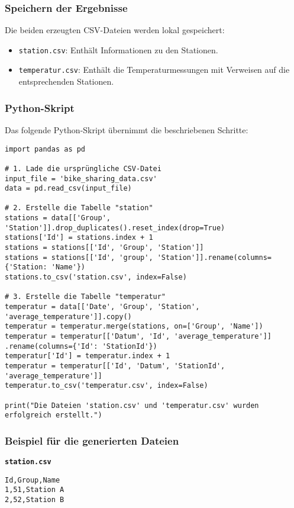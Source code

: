 \documentclass[a4paper,12pt]{article}
\begin{document}
\subsubsection{Speichern der Ergebnisse}
Die beiden erzeugten CSV-Dateien werden lokal gespeichert:
\begin{itemize}
    \item \texttt{station.csv}: Enthält Informationen zu den Stationen.
    \item \texttt{temperatur.csv}: Enthält die Temperaturmessungen mit Verweisen auf die entsprechenden Stationen.
\end{itemize}

\subsubsection{Python-Skript}
Das folgende Python-Skript übernimmt die beschriebenen Schritte:

\begin{verbatim}
import pandas as pd

# 1. Lade die ursprüngliche CSV-Datei
input_file = 'bike_sharing_data.csv'
data = pd.read_csv(input_file)

# 2. Erstelle die Tabelle "station"
stations = data[['Group', 'Station']].drop_duplicates().reset_index(drop=True)
stations['Id'] = stations.index + 1
stations = stations[['Id', 'Group', 'Station']]
stations = stations[['Id', 'group', 'Station']].rename(columns={'Station: 'Name'})
stations.to_csv('station.csv', index=False)

# 3. Erstelle die Tabelle "temperatur"
temperatur = data[['Date', 'Group', 'Station', 'average_temperature']].copy()
temperatur = temperatur.merge(stations, on=['Group', 'Name'])
temperatur = temperatur[['Datum', 'Id', 'average_temperature']]
.rename(columns={'Id': 'StationId'})
temperatur['Id'] = temperatur.index + 1
temperatur = temperatur[['Id', 'Datum', 'StationId', 'average_temperature']]
temperatur.to_csv('temperatur.csv', index=False)

print("Die Dateien 'station.csv' und 'temperatur.csv' wurden erfolgreich erstellt.")
\end{verbatim}

\subsubsection{Beispiel für die generierten Dateien}

\textbf{\texttt{station.csv}}
\begin{verbatim}
Id,Group,Name
1,51,Station A
2,52,Station B
\end{verbatim}
\end{document}
